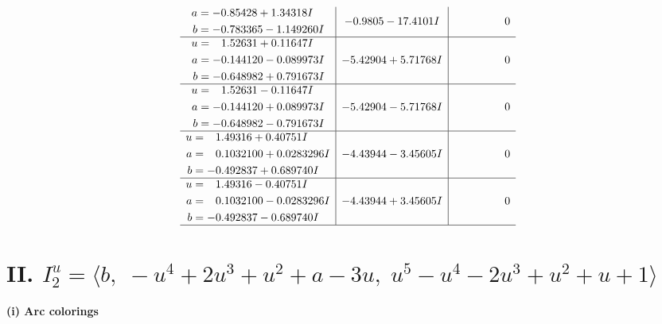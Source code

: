 \documentclass[1p]{elsarticle_modified}
\theoremstyle{definition}
\begin{document}
$$\begin{array}{c|c|c}
\begin{aligned}
a &= -0.85428 + 1.34318 I \\
b &= -0.783365 - 1.149260 I\end{aligned}
 & -0.9805 - 17.4101 I & \phantom{-0.000000 } 0 \\ \hline\begin{aligned}
u &= \phantom{-}1.52631 + 0.11647 I \\
a &= -0.144120 - 0.089973 I \\
b &= -0.648982 + 0.791673 I\end{aligned}
 & -5.42904 + 5.71768 I & \phantom{-0.000000 } 0 \\ \hline\begin{aligned}
u &= \phantom{-}1.52631 - 0.11647 I \\
a &= -0.144120 + 0.089973 I \\
b &= -0.648982 - 0.791673 I\end{aligned}
 & -5.42904 - 5.71768 I & \phantom{-0.000000 } 0 \\ \hline\begin{aligned}
u &= \phantom{-}1.49316 + 0.40751 I \\
a &= \phantom{-}0.1032100 + 0.0283296 I \\
b &= -0.492837 + 0.689740 I\end{aligned}
 & -4.43944 - 3.45605 I & \phantom{-0.000000 } 0 \\ \hline\begin{aligned}
u &= \phantom{-}1.49316 - 0.40751 I \\
a &= \phantom{-}0.1032100 - 0.0283296 I \\
b &= -0.492837 - 0.689740 I\end{aligned}
 & -4.43944 + 3.45605 I & \phantom{-0.000000 } 0\\
 \hline 
 \end{array}$$\newpage\newpage\renewcommand{\arraystretch}{1}
\centering \section*{II. $I^u_{2}= \langle b,\;- u^4+2 u^3+u^2+a-3 u,\;u^5- u^4-2 u^3+u^2+u+1 \rangle$}
\flushleft \textbf{(i) Arc colorings}\\
\end{document}
